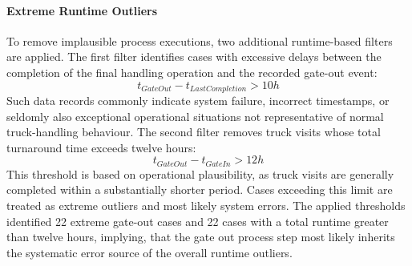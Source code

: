             \paragraph{Extreme Runtime Outliers} 
            To remove implausible process executions, two additional runtime-based filters are applied. The first filter identifies cases with excessive delays between the completion of the final handling operation and the recorded gate-out event: \begin{equation} t_{GateOut} - t_{LastCompletion} > 10h \end{equation} Such data records commonly indicate system failure, incorrect timestamps, or seldomly also exceptional operational situations not representative of normal truck-handling behaviour. The second filter removes truck visits whose total turnaround time exceeds twelve hours: \begin{equation} t_{GateOut} - t_{GateIn} > 12h \end{equation} This threshold is based on operational plausibility, as truck visits are generally completed within a substantially shorter period. Cases exceeding this limit are treated as extreme outliers and most likely system errors. The applied thresholds identified 22 extreme gate-out cases and 22 cases with a total runtime greater than twelve hours, implying, that the gate out process step most likely inherits the systematic error source of the overall runtime outliers. 
        
